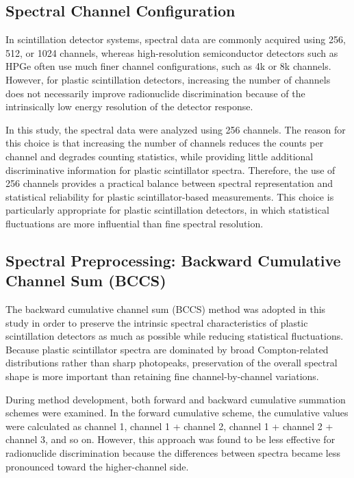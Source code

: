 \documentclass[10pt]{wlscirep}
\begin{document}
\subsection*{Spectral Channel Configuration}

In scintillation detector systems, spectral data are commonly acquired using 256, 512, or 1024 channels, whereas high-resolution semiconductor detectors such as HPGe often use much finer channel configurations, such as 4k or 8k channels. However, for plastic scintillation detectors, increasing the number of channels does not necessarily improve radionuclide discrimination because of the intrinsically low energy resolution of the detector response.

In this study, the spectral data were analyzed using 256 channels. The reason for this choice is that increasing the number of channels reduces the counts per channel and degrades counting statistics, while providing little additional discriminative information for plastic scintillator spectra. Therefore, the use of 256 channels provides a practical balance between spectral representation and statistical reliability for plastic scintillator-based measurements. This choice is particularly appropriate for plastic scintillation detectors, in which statistical
fluctuations are more influential than fine spectral resolution.


\subsection*{Spectral Preprocessing: Backward Cumulative Channel Sum (BCCS)}

The backward cumulative channel sum (BCCS) method was adopted in this study in order to preserve the intrinsic spectral characteristics of plastic scintillation detectors as much as possible while reducing statistical fluctuations. Because plastic scintillator spectra are dominated by broad Compton-related distributions rather than sharp photopeaks, preservation of the overall spectral shape is more important than retaining fine channel-by-channel variations.

During method development, both forward and backward cumulative summation schemes were examined. In the forward cumulative scheme, the cumulative values were calculated as channel 1, channel 1 + channel 2, channel 1 + channel 2 + channel 3, and so on. However, this approach was found to be less effective for radionuclide discrimination because the differences between spectra became less pronounced toward the higher-channel side.
\end{document}
